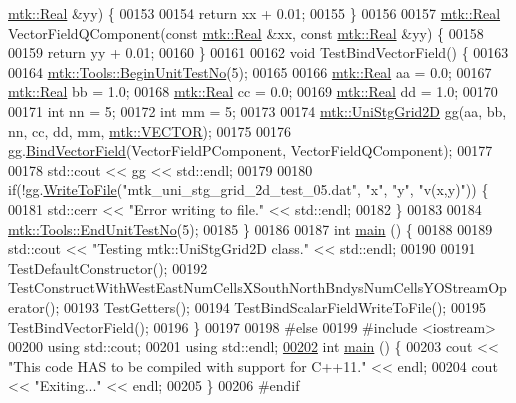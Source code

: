 \begin{DoxyCode}
      \hyperlink{group__c01-roots_gac080bbbf5cbb5502c9f00405f894857d}{mtk::Real} &yy) \{
00153 
00154   \textcolor{keywordflow}{return} xx + 0.01;
00155 \}
00156 
00157 \hyperlink{group__c01-roots_gac080bbbf5cbb5502c9f00405f894857d}{mtk::Real} VectorFieldQComponent(\textcolor{keyword}{const} \hyperlink{group__c01-roots_gac080bbbf5cbb5502c9f00405f894857d}{mtk::Real} &xx, \textcolor{keyword}{const} 
      \hyperlink{group__c01-roots_gac080bbbf5cbb5502c9f00405f894857d}{mtk::Real} &yy) \{
00158 
00159   \textcolor{keywordflow}{return} yy + 0.01;
00160 \}
00161 
00162 \textcolor{keywordtype}{void} TestBindVectorField() \{
00163 
00164   \hyperlink{classmtk_1_1Tools_afc29ecaf337a13ed2e817d3890a5a441}{mtk::Tools::BeginUnitTestNo}(5);
00165 
00166   \hyperlink{group__c01-roots_gac080bbbf5cbb5502c9f00405f894857d}{mtk::Real} aa = 0.0;
00167   \hyperlink{group__c01-roots_gac080bbbf5cbb5502c9f00405f894857d}{mtk::Real} bb = 1.0;
00168   \hyperlink{group__c01-roots_gac080bbbf5cbb5502c9f00405f894857d}{mtk::Real} cc = 0.0;
00169   \hyperlink{group__c01-roots_gac080bbbf5cbb5502c9f00405f894857d}{mtk::Real} dd = 1.0;
00170 
00171   \textcolor{keywordtype}{int} nn = 5;
00172   \textcolor{keywordtype}{int} mm = 5;
00173 
00174   \hyperlink{classmtk_1_1UniStgGrid2D}{mtk::UniStgGrid2D} gg(aa, bb, nn, cc, dd, mm, \hyperlink{namespacemtk_ga4c54f2a329cfb4e56213b02a259d19e2a3d8cb27a993651a74d67fb8c98ae91b2}{mtk::VECTOR});
00175 
00176   gg.\hyperlink{classmtk_1_1UniStgGrid2D_ae274b24672e9bd6075bf38b015bd9083}{BindVectorField}(VectorFieldPComponent, VectorFieldQComponent);
00177 
00178   std::cout << gg << std::endl;
00179 
00180   \textcolor{keywordflow}{if}(!gg.\hyperlink{classmtk_1_1UniStgGrid2D_a1787a79e4bcee6b89c681dc7e5e2d7bc}{WriteToFile}(\textcolor{stringliteral}{"mtk\_uni\_stg\_grid\_2d\_test\_05.dat"}, \textcolor{stringliteral}{"x"}, \textcolor{stringliteral}{"y"}, \textcolor{stringliteral}{"v(x,y)"})) \{
00181     std::cerr << \textcolor{stringliteral}{"Error writing to file."} << std::endl;
00182   \}
00183 
00184   \hyperlink{classmtk_1_1Tools_aba67d9dc35c9c1c49430fcc9ea035e03}{mtk::Tools::EndUnitTestNo}(5);
00185 \}
00186 
00187 \textcolor{keywordtype}{int} \hyperlink{mtk__uni__stg__grid__2d__test_8cc_ae66f6b31b5ad750f1fe042a706a4e3d4}{main} () \{
00188 
00189   std::cout << \textcolor{stringliteral}{"Testing mtk::UniStgGrid2D class."} << std::endl;
00190 
00191   TestDefaultConstructor();
00192   TestConstructWithWestEastNumCellsXSouthNorthBndysNumCellsYOStreamOperator();
00193   TestGetters();
00194   TestBindScalarFieldWriteToFile();
00195   TestBindVectorField();
00196 \}
00197 
00198 \textcolor{preprocessor}{#else}
00199 \textcolor{preprocessor}{#include <iostream>}
00200 \textcolor{keyword}{using} std::cout;
00201 \textcolor{keyword}{using} std::endl;
\hypertarget{mtk__uni__stg__grid__2d__test_8cc_source_l00202}{}\hyperlink{mtk__uni__stg__grid__2d__test_8cc_ae66f6b31b5ad750f1fe042a706a4e3d4}{00202} \textcolor{keywordtype}{int} \hyperlink{mtk__uni__stg__grid__2d__test_8cc_ae66f6b31b5ad750f1fe042a706a4e3d4}{main} () \{
00203   cout << \textcolor{stringliteral}{"This code HAS to be compiled with support for C++11."} << endl;
00204   cout << \textcolor{stringliteral}{"Exiting..."} << endl;
00205 \}
00206 \textcolor{preprocessor}{#endif}
\end{DoxyCode}
